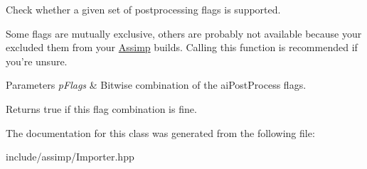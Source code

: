 \-Check whether a given set of postprocessing flags is supported. 

\-Some flags are mutually exclusive, others are probably not available because your excluded them from your \hyperlink{namespaceAssimp}{\-Assimp} builds. \-Calling this function is recommended if you're unsure.


\begin{DoxyParams}{\-Parameters}
{\em p\-Flags} & \-Bitwise combination of the ai\-Post\-Process flags. \\
\hline
\end{DoxyParams}
\begin{DoxyReturn}{\-Returns}
true if this flag combination is fine. 
\end{DoxyReturn}


\-The documentation for this class was generated from the following file\-:\begin{DoxyCompactItemize}
\item 
include/assimp/\-Importer.\-hpp\end{DoxyCompactItemize}
